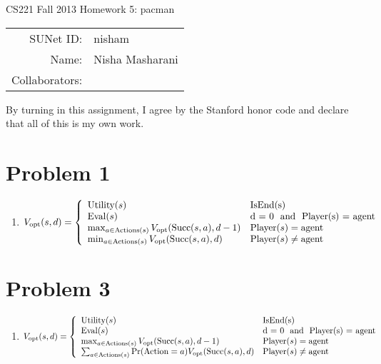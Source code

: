 \documentclass[12pt]{article}
\begin{document}
\begin{center}
{\Large CS221 Fall 2013 Homework 5: pacman}

\begin{tabular}{rl}
SUNet ID: & nisham \\
Name: & Nisha Masharani \\
Collaborators: & 
\end{tabular}
\end{center}

By turning in this assignment, I agree by the Stanford honor code and declare
that all of this is my own work.

\section*{Problem 1}

\begin{enumerate}[label=(\alph*)]
  \item $V_{\text{opt}}(s, d) = 
  \left\{
  \begin{array}{ll}
  \text{Utility}(s)  & \text{IsEnd(s)} \\ 
  \text{Eval}(s)  & \text{d = 0 \text{ and } \text{Player}(s) = \text{agent}} \\ 
  \max_{a \in \text{Actions}(s)}  V_{\text{opt}}(\text{Succ}(s, a), d-1) & \text{Player}(s) = \text{agent} \\ 
  \min_{a \in \text{Actions}(s)}  V_{\text{opt}}(\text{Succ}(s, a), d) & \text{Player}(s) \ne \text{agent} \\ 
  \end{array}
  \right.$
\end{enumerate}

\section*{Problem 3}

\begin{enumerate}[label=(\alph*)]
  \item $V_{\text{opt}}(s, d) = 
  \left\{
  \begin{array}{ll}
  \text{Utility}(s)  & \text{IsEnd(s)} \\ 
  \text{Eval}(s)  & \text{d = 0 \text{ and } \text{Player}(s) = \text{agent}} \\ 
  \max_{a \in \text{Actions}(s)}  V_{\text{opt}}(\text{Succ}(s, a), d-1) & \text{Player}(s) = \text{agent} \\ 
  \sum_{a \in \text{Actions}(s)}  \Pr(\text{Action} = a)V_{\text{opt}}(\text{Succ}(s, a), d) & \text{Player}(s) \ne \text{agent} \\ 
  \end{array}
  \right.$
\end{enumerate}
\end{document}
